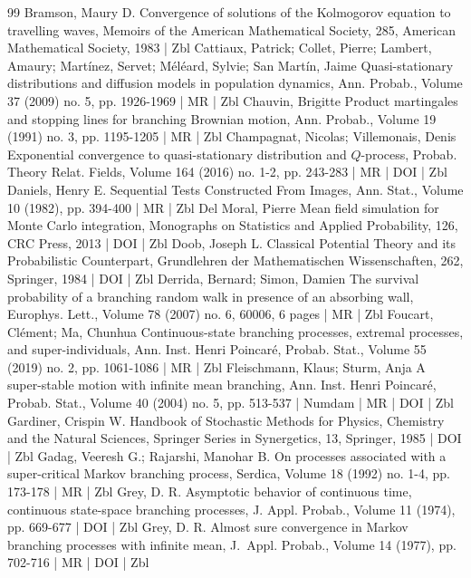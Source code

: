 \begin{thebibliography}{99}
Bramson, Maury D. Convergence of solutions of the Kolmogorov equation to travelling waves, Memoirs of the American Mathematical Society, 285, American Mathematical Society, 1983 | Zbl
Cattiaux, Patrick; Collet, Pierre; Lambert, Amaury; Martínez, Servet; Méléard, Sylvie; San Martín, Jaime Quasi-stationary distributions and diffusion models in population dynamics, Ann. Probab., Volume 37 (2009) no. 5, pp. 1926-1969 | MR | Zbl
Chauvin, Brigitte Product martingales and stopping lines for branching Brownian motion, Ann. Probab., Volume 19 (1991) no. 3, pp. 1195-1205 | MR | Zbl
Champagnat, Nicolas; Villemonais, Denis Exponential convergence to quasi-stationary distribution and ${Q}$-process, Probab. Theory Relat. Fields, Volume 164 (2016) no. 1-2, pp. 243-283 | MR | DOI | Zbl
Daniels, Henry E. Sequential Tests Constructed From Images, Ann. Stat., Volume 10 (1982), pp. 394-400 | MR | Zbl
Del Moral, Pierre Mean field simulation for Monte Carlo integration, Monographs on Statistics and Applied Probability, 126, CRC Press, 2013 | DOI | Zbl
Doob, Joseph L. Classical Potential Theory and its Probabilistic Counterpart, Grundlehren der Mathematischen Wissenschaften, 262, Springer, 1984 | DOI | Zbl
Derrida, Bernard; Simon, Damien The survival probability of a branching random walk in presence of an absorbing wall, Europhys. Lett., Volume 78 (2007) no. 6, 60006, 6 pages | MR | Zbl
Foucart, Clément; Ma, Chunhua Continuous-state branching processes, extremal processes, and super-individuals, Ann. Inst. Henri Poincaré, Probab. Stat., Volume 55 (2019) no. 2, pp. 1061-1086 | MR | Zbl
Fleischmann, Klaus; Sturm, Anja A super-stable motion with infinite mean branching, Ann. Inst. Henri Poincaré, Probab. Stat., Volume 40 (2004) no. 5, pp. 513-537 | Numdam | MR | DOI | Zbl
Gardiner, Crispin W. Handbook of Stochastic Methods for Physics, Chemistry and the Natural Sciences, Springer Series in Synergetics, 13, Springer, 1985 | DOI | Zbl
Gadag, Veeresh G.; Rajarshi, Manohar B. On processes associated with a super-critical Markov branching process, Serdica, Volume 18 (1992) no. 1-4, pp. 173-178 | MR | Zbl
Grey, D. R. Asymptotic behavior of continuous time, continuous state-space branching processes, J. Appl. Probab., Volume 11 (1974), pp. 669-677 | DOI | Zbl
Grey, D. R. Almost sure convergence in Markov branching processes with infinite mean, J. Appl. Probab., Volume 14 (1977), pp. 702-716 | MR | DOI | Zbl

\end{thebibliography}
